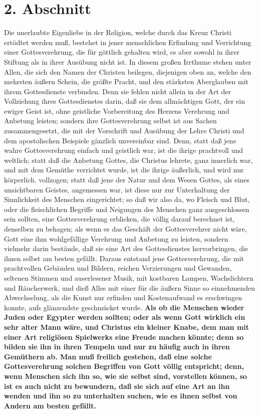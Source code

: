 \section{2. Abschnitt} \label{kap5_ab2}

Die unerlaubte Eigenliebe in der Religion, welche durch das Kreuz Christi
ertödtet werden muß, bestehet in jener menschlichen Erfindung und Verrichtung
einer Gottesverehrung, die für göttlich gehalten wird, es aber sowohl in ihrer
Stiftung als in ihrer Ausübung nicht ist. In diesem großen Irrthume stehen unter
Allen, die sich den Namen der Christen beilegen, diejenigen oben an, welche den
mehrsten äußern Schein, die größte Pracht, und den stärksten Aberglauben mit
ihrem Gottesdienste verbinden. Denn sie fehlen nicht allein in der Art der
Vollziehung ihres Gottesdienstes darin, daß sie dem allmächtigen Gott, der ein
ewiger Geist ist, ohne geistliche Vorbereitung 
des Herzens Verehrung und
Anbetung leisten; sondern ihre Gottesverehrung selbst ist aus Sachen
zusammengesetzt, die mit der Vorschrift und Ausübung der Lehre Christi und dem
apostolischen Beispiele gänzlich unvereinbar sind. Denn, statt daß jene wahre
Gottesverehrung einfach und geistlich war, ist die ihrige prachtvoll und
weltlich; statt daß die Anbetung Gottes, die Christus lehrete, ganz innerlich
war, und mit dem Gemüthe verrichtet wurde, ist die ihrige äußerlich, und wird
nur körperlich. vollzogen; statt daß jene der Natur und dem Wesen Gottes, als
eines unsichtbaren Geistes, angemessen war, ist diese nur zur Unterhaltung der
Sinnlichkeit des Menschen eingerichtet; so daß wir also da, wo Fleisch und Blut,
oder die fleischlichen Begriffe und Neigungen des Menschen ganz ausgeschlossen
sein sollten, eine Gottesverehrung erblicken, die völlig darauf berechnet ist,
denselben zu behagen; als wenn es das Geschäft der Gottesverehrer nicht wäre,
Gott eine ihm wohlgefällige Verehrung und Anbetung zu leisten, sondern vielmehr
darin bestände, daß sie eine Art des Gottesdienstes hervorbringen, die ihnen
selbst am besten gefällt. Daraus entstand jene Gottesverehrung, die mit
prachtvollen Gebäuden und Bildern, reichen Verzierungen und Gewanden, seltenen
Stimmen und auserlesener Musik, mit kostbaren Lampen,
Wachslichtern und
Räucherwerk, und dieß Alles mit einer für die äußern Sinne so
einnehmenden
Abwechselung, als die Kunst nur erfinden und Kostenaufwand es erschwingen
konnte, aufs glänzendste geschmücket wurde. \textbf{Als ob die Menschen wieder
Juden
oder Egypter  werden sollten;
oder als wenn Gott  wirklich ein sehr alter Mann
wäre, und Christus ein kleiner Knabe, dem man mit einer Art religiösen
Spielwerks eine Freude machen könnte; denn so bilden sie ihn in ihren Tempeln
und nur zu häufig auch in ihren Gemüthern ab. Man muß freilich gestehen, daß
eine solche Gottesverehrung solchen Begriffen von Gott völlig entspricht; denn,
wenn Menschen sich ihn so, wie sie selbst sind, vorstellen können, so ist es
auch nicht zu  bewundern, daß sie sich auf eine Art an ihn wenden und ihn so zu
unterhalten suchen, wie es ihnen selbst von Andern am besten gefällt.}

